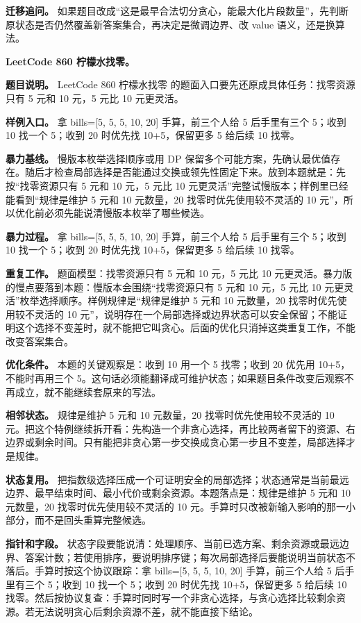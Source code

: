 \textbf{迁移追问。} 如果题目改成“这是最早合法切分贪心，能最大化片段数量”，先判断原状态是否仍然覆盖新答案集合，再决定是微调边界、改 value 语义，还是换算法。

\noindent\textbf{LeetCode 860 柠檬水找零。}

\textbf{题目说明。} LeetCode 860 柠檬水找零 的题面入口要先还原成具体任务：找零资源只有 5 元和 10 元，5 元比 10 元更灵活。

\textbf{样例入口。} 拿 bills=[5, 5, 5, 10, 20] 手算，前三个人给 5 后手里有三个 5；收到 10 找一个 5；收到 20 时优先找 10+5，保留更多 5 给后续 10 找零。

\textbf{暴力基线。} 慢版本枚举选择顺序或用 DP 保留多个可能方案，先确认最优值存在。随后才检查局部选择是否能通过交换或领先性固定下来。放到本题就是：先按“找零资源只有 5 元和 10 元，5 元比 10 元更灵活”完整试慢版本；样例里已经能看到“规律是维护 5 元和 10 元数量，20 找零时优先使用较不灵活的 10 元”，所以优化前必须先能说清慢版本枚举了哪些候选。

\textbf{暴力过程。} 拿 bills=[5, 5, 5, 10, 20] 手算，前三个人给 5 后手里有三个 5；收到 10 找一个 5；收到 20 时优先找 10+5，保留更多 5 给后续 10 找零。

\textbf{重复工作。} 题面模型：找零资源只有 5 元和 10 元，5 元比 10 元更灵活。暴力版的慢点要落到本题：慢版本会围绕“找零资源只有 5 元和 10 元，5 元比 10 元更灵活”枚举选择顺序。样例规律是“规律是维护 5 元和 10 元数量，20 找零时优先使用较不灵活的 10 元”，说明存在一个局部选择或边界状态可以安全保留；不能证明这个选择不变差时，就不能把它叫贪心。后面的优化只消掉这类重复工作，不能改变答案集合。

\textbf{优化条件。} 本题的关键观察是：收到 10 用一个 5 找零；收到 20 优先用 10+5，不能时再用三个 5。这句话必须能翻译成可维护状态；如果题目条件改变后观察不再成立，就不能继续套原来的写法。

\textbf{相邻状态。} 规律是维护 5 元和 10 元数量，20 找零时优先使用较不灵活的 10 元。把这个特例继续拆开看：先构造一个非贪心选择，再比较两者留下的资源、右边界或剩余时间。只有能把非贪心第一步交换成贪心第一步且不变差，局部选择才是规律。

\textbf{状态复用。} 把指数级选择压成一个可证明安全的局部选择；状态通常是当前最远边界、最早结束时间、最小代价或剩余资源。本题落点是：规律是维护 5 元和 10 元数量，20 找零时优先使用较不灵活的 10 元。手算时只改被新输入影响的那一小部分，而不是回头重算完整候选。

\textbf{指针和字段。} 状态字段要能说清：处理顺序、当前已选方案、剩余资源或最远边界、答案计数；若使用排序，要说明排序键；每次局部选择后要能说明当前状态不落后。手算时按这个协议跟踪：拿 bills=[5, 5, 5, 10, 20] 手算，前三个人给 5 后手里有三个 5；收到 10 找一个 5；收到 20 时优先找 10+5，保留更多 5 给后续 10 找零。然后按协议复查：手算时同时写一个非贪心选择，与贪心选择比较剩余资源。若无法说明贪心后剩余资源不差，就不能直接下结论。

